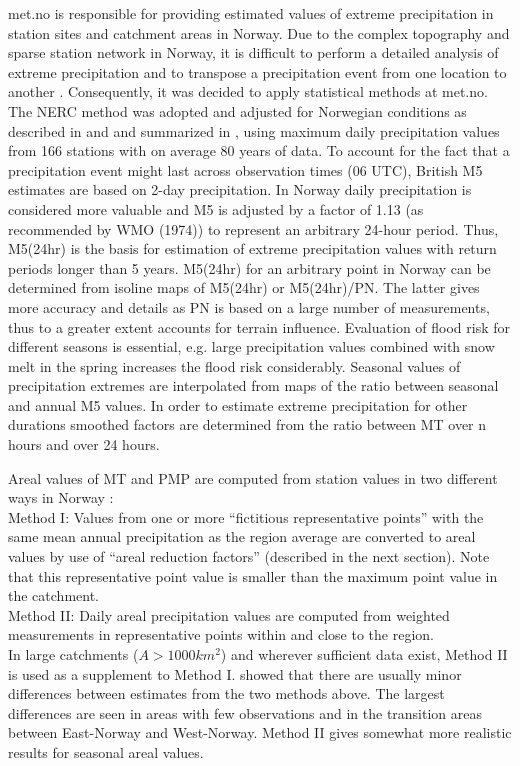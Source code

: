 \documentclass[12pt,a4paper,english]{article}
\begin{document}
met.no is responsible for providing estimated values of extreme precipitation in station sites and catchment areas in Norway. Due to the complex topography and sparse station network in Norway, it is difficult to perform a detailed analysis of extreme precipitation and to transpose a precipitation event from one location to another \citep[see transposition method described below][]{WMO2009a}. Consequently, it was decided to apply statistical methods at met.no. The NERC method was adopted and adjusted for Norwegian conditions as described in \cite{Forland1983, Forland1984a,Forland1987, Forland1990} and \cite{ForlandandKristoffersen1988} and summarized in \cite{Forland1992}, using maximum daily precipitation values from 166 stations with on average 80 years of data. 
To account for the fact that a precipitation event might last across observation times (06 UTC), British M5 estimates are based on 2-day precipitation. In Norway daily precipitation is considered more valuable and M5 is adjusted by a factor of 1.13 (as recommended by WMO (1974)) to represent an arbitrary 24-hour period. Thus, M5(24hr) is the basis for estimation of extreme precipitation values with return periods longer than 5 years. M5(24hr) for an arbitrary point in Norway can be determined from isoline maps of M5(24hr) or M5(24hr)/PN. The latter gives more accuracy and details as PN is based on a large number of measurements, thus to a greater extent accounts for terrain influence.
Evaluation of flood risk for different seasons is essential, e.g. large precipitation values combined with snow melt in the spring increases the flood risk considerably. Seasonal values of precipitation extremes are interpolated from maps of the ratio between seasonal and annual M5 values. In order to estimate extreme precipitation for other durations smoothed factors are determined from the ratio between MT over n hours and over 24 hours.

Areal values of MT and PMP are computed from station values in two different ways in Norway \citep{ForlandandKristoffersen1988}:\\
Method I: Values from one or more ``fictitious representative points'' with the same mean annual precipitation as the region average are converted to areal values by use of ``areal reduction factors'' (described in the next section). Note that this representative point value is smaller than the maximum point value in the catchment.\\
Method II: Daily areal precipitation values are computed from weighted measurements in representative points within and close to the region. \\
In large catchments ($A>1000 km^{2}$) and wherever sufficient data exist, Method II is used as a supplement to Method I. \cite{Forland1992} showed that there are usually minor differences between estimates from the two methods above. The largest differences are seen in areas with few observations and in the transition areas between East-Norway and West-Norway. Method II gives somewhat more realistic results for seasonal areal values.
\end{document}
